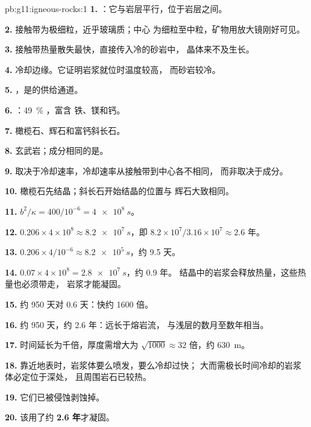 \begin{solution}{pb:g11:igneous-rocks:1}
\textbf{1.} ：它与岩层平行，位于岩层之间。

\textbf{2.} 接触带为极细粒，近乎玻璃质；中心
为细粒至中粒，矿物用放大镜刚好可见。

\textbf{3.} 接触带热量散失最快，直接传入冷的砂岩中，
晶体来不及生长。

\textbf{4.} 冷却边缘。它证明岩浆就位时温度较高，
而砂岩较冷。

\textbf{5.} ，是的供给通道。

\textbf{6.} ：\qty{49}{\percent} ，富含
铁、镁和钙。

\textbf{7.} 橄榄石、辉石和富钙斜长石。

\textbf{8.} 玄武岩；成分相同的是。

\textbf{9.} 取决于冷却速率，冷却速率从接触带到中心各不相同，
而非取决于成分。

\textbf{10.} 橄榄石先结晶；斜长石开始结晶的位置与
辉石大致相同。

\textbf{11.} $b^2/\kappa = 400/10^{-6} = \qty{4e8}{s}$。

\textbf{12.} $0.206 \times 4 \times 10^8 \approx \qty{8.2e7}{s}$，即
$8.2 \times 10^7 / 3.16 \times 10^7 \approx 2.6$ 年。

\textbf{13.} $0.206 \times 4/10^{-6} \approx \qty{8.2e5}{s}$，约 9.5
天。

\textbf{14.} $0.07 \times 4 \times 10^8 = \qty{2.8e7}{s}$，约 0.9 年。
结晶中的岩浆会释放热量，这些热量也必须带走，
岩浆才能凝固。

\textbf{15.} 约 950 天对 0.6 天：快约 1600 倍。

\textbf{16.} 约 950 天，约 2.6 年：远长于熔岩流，
与浅层的数月至数年相当。

\textbf{17.} 时间延长为千倍，厚度需增大为 $\sqrt{1000} \approx
32$ 倍，约 \qty{630}{m}。

\textbf{18.} 靠近地表时，岩浆体要么喷发，要么冷却过快；
大而需极长时间冷却的岩浆体必定位于深处，
且周围岩石已较热。

\textbf{19.} 它们已被侵蚀剥蚀掉。

\textbf{20.} 该用了约 \textbf{2.6 年}才凝固。
\end{solution}
